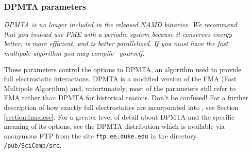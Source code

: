 \subsubsection{DPMTA parameters}

{\em DPMTA is no longer included in the released NAMD binaries.
We recommend that you instead use PME with a periodic system because
it conserves energy better, is more efficient, and is better parallelized.
If you must have the fast multipole algorithm you may compile \NAMD\ yourself.} 

These parameters control the options to DPMTA, an algorithm
used to provide full electrostatic interactions.  DPMTA is a
modified version of the FMA (Fast Multipole Algorithm) and, 
unfortunately, most of the parameters still refer to FMA
rather than DPMTA for historical reasons.  Don't be confused!
\prettypar
For a further description of how exactly full electrostatics
are incorporated into \NAMD, see Section \ref{section:fmadesc}.
For a greater level of detail about DPMTA and the specific
meaning of its options, see the DPMTA distribution which is
available via anonymous FTP from the site {\tt ftp.ee.duke.edu}
in the directory {\tt /pub/SciComp/src}.

